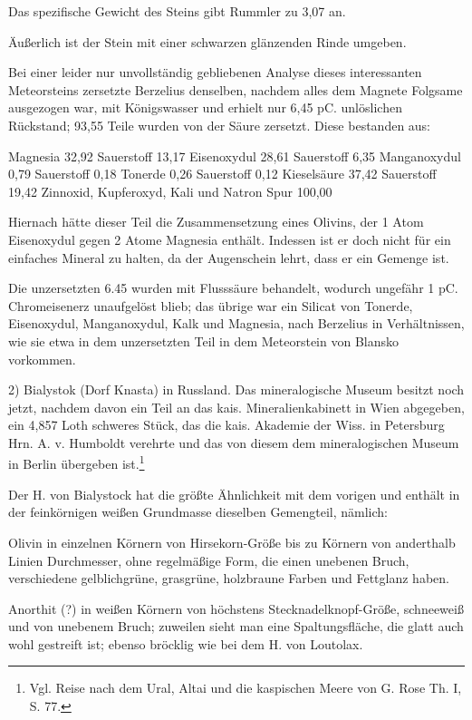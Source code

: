\documentclass[a4paper, 11pt, oneside]{article}
\begin{document}
Das spezifische Gewicht des Steins gibt Rummler zu 3,07 an.

Äußerlich ist der Stein mit einer schwarzen glänzenden Rinde umgeben.

Bei einer leider nur unvollständig gebliebenen Analyse dieses interessanten Meteorsteins zersetzte Berzelius denselben, nachdem alles dem Magnete Folgsame ausgezogen war, mit Königswasser und erhielt nur 6,45 pC. unlöslichen Rückstand; 93,55 Teile wurden von der Säure zersetzt. Diese bestanden aus:

Magnesia 32,92 Sauerstoff 13,17  
Eisenoxydul 28,61 Sauerstoff 6,35  
Manganoxydul 0,79 Sauerstoff 0,18  
Tonerde 0,26 Sauerstoff 0,12  
Kieselsäure 37,42 Sauerstoff 19,42  
Zinnoxid, Kupferoxyd, Kali und Natron Spur  
100,00  

Hiernach hätte dieser Teil die Zusammensetzung eines Olivins, der 1 Atom Eisenoxydul gegen 2 Atome Magnesia enthält. Indessen ist er doch nicht für ein einfaches Mineral zu halten, da der Augenschein lehrt, dass er ein Gemenge ist.

Die unzersetzten 6.45 wurden mit Flusssäure behandelt, wodurch ungefähr 1 pC. Chromeisenerz unaufgelöst blieb; das übrige war ein Silicat von Tonerde, Eisenoxydul, Manganoxydul, Kalk und Magnesia, nach Berzelius in Verhältnissen, wie sie etwa in dem unzersetzten Teil in dem Meteorstein von Blansko vorkommen.

2) Bialystok (Dorf Knasta) in Russland. Das mineralogische Museum besitzt noch jetzt, nachdem davon ein Teil an das kais. Mineralienkabinett in Wien abgegeben, ein 4,857 Loth schweres Stück, das die kais. Akademie der Wiss. in Petersburg Hrn. A. v. Humboldt verehrte und das von diesem dem mineralogischen Museum in Berlin übergeben ist.\footnote{Vgl. Reise nach dem Ural, Altai und die kaspischen Meere von G. Rose Th. I, S. 77.}

Der H. von Bialystock hat die größte Ähnlichkeit mit dem vorigen und enthält in der feinkörnigen weißen Grundmasse dieselben Gemengteil, nämlich:

Olivin in einzelnen Körnern von Hirsekorn-Größe bis zu Körnern von anderthalb Linien Durchmesser, ohne regelmäßige Form, die einen unebenen Bruch, verschiedene gelblichgrüne, grasgrüne, holzbraune Farben und Fettglanz haben.

Anorthit (?) in weißen Körnern von höchstens Stecknadelknopf-Größe, schneeweiß und von unebenem Bruch; zuweilen sieht man eine Spaltungsfläche, die glatt auch wohl gestreift ist; ebenso bröcklig wie bei dem H. von Loutolax.
\end{document}
